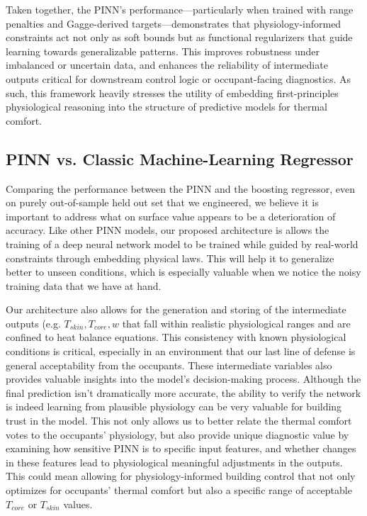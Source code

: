 Taken together, the PINN’s performance—particularly when trained with range penalties and Gagge-derived targets—demonstrates that physiology-informed constraints act not only as soft bounds but as functional regularizers that guide learning towards generalizable patterns. This improves robustness under imbalanced or uncertain data, and enhances the reliability of intermediate outputs critical for downstream control logic or occupant-facing diagnostics. As such, this framework heavily stresses the utility of embedding first-principles physiological reasoning into the structure of predictive models for thermal comfort.

\subsection{PINN vs. Classic Machine-Learning Regressor}

Comparing the performance between the PINN and the boosting regressor, even on purely out-of-sample held out set that we engineered, we believe it is important to address what on surface value appears to be a deterioration of accuracy. Like other PINN models, our proposed architecture is allows the training of a deep neural network model to be trained while guided by real-world constraints through embedding physical laws. This will help it to generalize better to unseen conditions, which is especially valuable when we notice the noisy training data that we have at hand.

Our architecture also allows for the generation and storing of the intermediate outputs (e.g. $T_{skin}, T_{core}, w$ that fall within realistic physiological ranges and are confined to heat balance equations. This consistency with known physiological conditions is critical, especially in an environment that our last line of defense is general acceptability from the occupants. These intermediate variables also provides valuable insights into the model's decision-making process. Although the final prediction isn't dramatically more accurate, the ability to verify the network is indeed learning from plausible physiology can be very valuable for building trust in the model. This not only allows us to better relate the thermal comfort votes to the occupants' physiology, but also provide unique diagnostic value by examining how sensitive PINN is to specific input features, and whether changes in these features lead to physiological meaningful adjustments in the outputs. This could mean allowing for physiology-informed building control that not only optimizes for occupants' thermal comfort but also a specific range of acceptable $T_{core}$ or $T_{skin}$ values.

